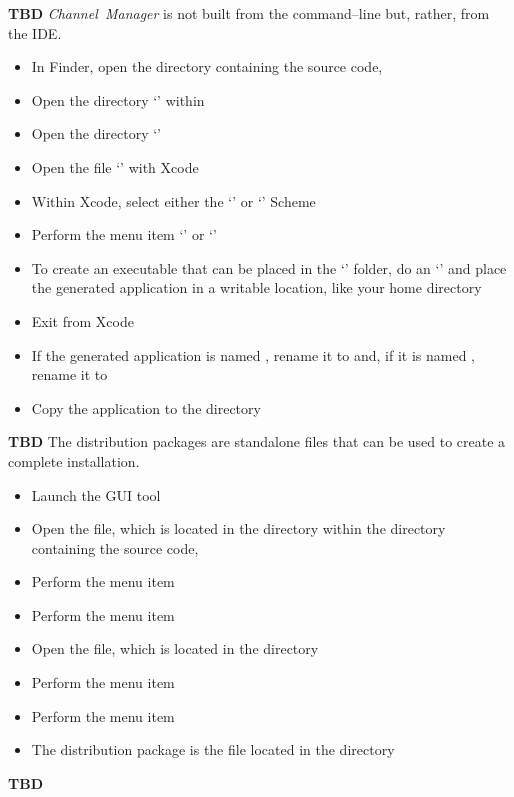 \tertiaryEnd{}
\textbf{TBD}
\tertiaryEnd{}
\secondaryEnd{}
\textit{Channel~Manager} is not built from the command--line but, rather, from the IDE.
\begin{itemize}
\item In Finder, open the directory containing the \mplusm source code, 
\item Open the directory `' within
\item Open the directory `'
\item Open the file `' with Xcode
\item Within Xcode, select either the `' or
`' Scheme
\item Perform the menu item `' or
`'
\item To create an executable that can be placed in the `' folder,
do an `'
and place the generated application in a writable location, like your home directory
\item Exit from Xcode
\item If the generated application is named , rename it to
 and, if it is named , rename it
to 
\item Copy the  application to the 
directory
\end{itemize}
\tertiaryEnd{}
\textbf{TBD}
\tertiaryEnd{}
\secondaryEnd{}
The distribution packages are standalone files that can be used to create a complete
\mplusm{} installation.
\begin{itemize}
\item Launch the  GUI tool
\item Open the  file, which is located in the
 directory within the directory containing the \mplusm{} source
code, 
\item Perform the menu item 
\item Perform the menu item 
\item Open the  file, which is located in the  directory
\item Perform the menu item 
\item Perform the menu item 
\item The distribution package is the  file located in the
 directory
\end{itemize}
\tertiaryEnd{}
\textbf{TBD}
\tertiaryEnd{}
\secondaryEnd{}
\appendixEnd{}
